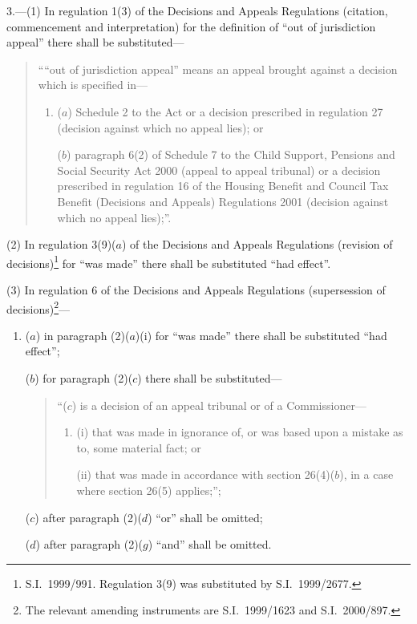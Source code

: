 \documentclass[12pt,a4paper]{article}
\begin{document}
3.---(1)  In regulation 1(3) of the Decisions and Appeals Regulations (citation, commencement and interpretation) for the definition of “out of jurisdiction appeal” there shall be substituted—
\pagebreak[3]
\begin{quotation}
““out of jurisdiction appeal” means an appeal brought against a decision which is specified in—
\begin{enumerate}\item[]
($a$) 
Schedule 2 to the Act or a decision prescribed in regulation 27 (decision against which no appeal lies); or

($b$) 
paragraph 6(2) of Schedule 7 to the Child Support, Pensions and Social Security Act 2000 (appeal to appeal tribunal) or a decision prescribed in regulation 16 of the Housing Benefit and Council Tax Benefit (Decisions and Appeals) Regulations 2001 (decision against which no appeal lies);”.
\end{enumerate}
\end{quotation}

(2) In regulation 3(9)($a$)  of the Decisions and Appeals Regulations (revision of decisions)\footnote{S.I.\ 1999/991. Regulation 3(9) was substituted by S.I.\ 1999/2677.} for “was made” there shall be substituted “had effect”.

(3) In regulation 6 of the Decisions and Appeals Regulations (supersession of decisions)\footnote{The relevant amending instruments are S.I.\ 1999/1623 and S.I.\ 2000/897.}—
\begin{enumerate}\item[]
($a$) in paragraph (2)($a$)(i)  for “was made” there shall be substituted “had effect”;

($b$) for paragraph (2)($c$)  there shall be substituted—
\begin{quotation}
“($c$) is a decision of an appeal tribunal or of a Commissioner—
\begin{enumerate}\item[]
(i) that was made in ignorance of, or was based upon a mistake as to, some material fact; or

(ii) that was made in accordance with section 26(4)($b$), in a case where section 26(5) applies;”;
\end{enumerate}
\end{quotation}

($c$) after paragraph (2)($d$)  “or” shall be omitted;

($d$) after paragraph (2)($g$)  “and” shall be omitted.
\end{enumerate}
\end{document}
